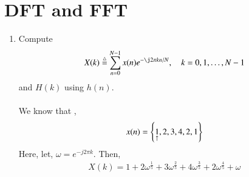 \documentclass[journal,12pt,twocolumn]{IEEEtran}
\renewcommand\thesection{\arabic{section}}
\begin{document}
%
\section{DFT and FFT}
\begin{enumerate}[label=\thesection.\arabic*]
\item
Compute
\begin{equation}
X(k) \define \sum _{n=0}^{N-1}x(n) e^{-\j2\pi kn/N}, \quad k = 0,1,\dots, N-1
\end{equation}
and $H(k)$ using $h(n)$.
\\\solution\\
We know that ,\\
\begin{equation}
	x(n) = \left\{\underset{\uparrow}{1},2,3,4,2,1\right\}
\end{equation}
Here, let, $\omega=e^{-j2\pi k}$. Then,
\begin{align}
	X(k)=1+2\omega^{\frac{1}{5}}+3\omega^{\frac{2}{5}}+4\omega^{\frac{3}{5}}+2\omega^{\frac{4}{5}}+\omega
	\label{eq:Xkdef}
\end{align}


\end{enumerate}
\end{document}
